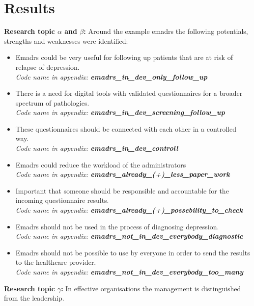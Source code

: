 \documentclass[12pt,a4paper,oneside]{article}
\let\oldcite\cite
\renewcommand*\cite[1]{\textsuperscript{\oldcite{#1}}}
\begin{document}
\section*{Results}
{\bf Research topic $\alpha$ and $\beta$:} Around the example e{\sc madrs} the following potentials, strengths and weaknesses were identified:
\begin{itemize}
\item E{\sc madrs} could be very useful for following up patients that are at risk of relapse of depression.\\{\it Code name in appendix: {\bfseries emadrs\_in\_dev\_only\_follow\_up}}
\item There is a need for digital tools with validated questionnaires for a broader spectrum of pathologies.\\{\it Code name in appendix: {\bfseries emadrs\_in\_dev\_screening\_follow\_up}}
\item These questionnaires should be connected with each other in a controlled way.\\{\it Code name in appendix: {\bfseries emadrs\_in\_dev\_controll}}
\item E{\sc madrs} could reduce the workload of the administrators\\{\it Code name in appendix: {\bfseries emadrs\_already\_(+)\_less\_paper\_work}}
\item Important that someone should be responsible and accountable for the incoming questionnaire results.\\{\it Code name in appendix: {\bfseries emadrs\_already\_(+)\_possebility\_to\_check}}
\item E{\sc madrs} should not be used in the process of diagnosing depression.\\{\it Code name in appendix: {\bfseries emadrs\_not\_in\_dev\_everybody\_diagnostic}}
\item E{\sc madrs} should not be possible to use by everyone in order to send the results to the healthcare provider.\\{\it Code name in appendix: {\bfseries emadrs\_not\_in\_dev\_everybody\_too\_many}}
\end{itemize}
{\bf Research topic $\gamma$:} In effective organisations the management is distinguished from the leadership\cite{leader1}. 
\end{document}
